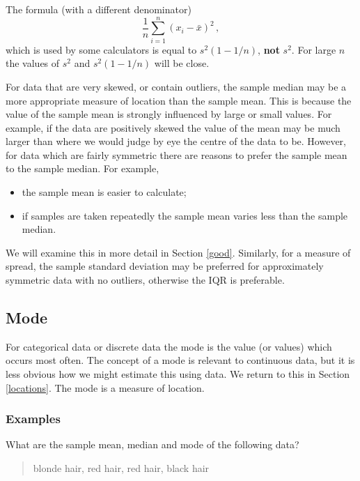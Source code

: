 \documentclass[
  british,
  11pt,
  openany, a4paper]{book}
\providecommand{\tightlist}{%
  \setlength{\itemsep}{0pt}\setlength{\parskip}{0pt}}
\begin{document}
The formula (with a different denominator)
\[ \frac{1}{n}\sum_{i=1}^n (x_i-\bar{x})^2 \,,\]
which is used by some calculators is equal to \(s^2 (1-1/n)\), \textbf{not} \(s^2\). For large \(n\) the values of \(s^2\) and \(s^2(1-1/n)\) will be close.

For data that are very skewed, or contain outliers, the sample median may be a more appropriate measure of location than the sample mean. This is because the value of the sample mean is strongly influenced by large or small values. For example, if the data are positively skewed the value of the mean may be much larger than where we would judge by eye the centre of the data to be. However, for data which are fairly symmetric there are reasons to prefer the sample mean to the sample median. For example,

\begin{itemize}
\tightlist
\item
  the sample mean is easier to calculate;
\item
  if samples are taken repeatedly the sample mean varies less than the sample median.
\end{itemize}

We will examine this in more detail in Section \ref{good}. Similarly, for a measure of spread, the sample standard deviation may be preferred for approximately symmetric data with no outliers, otherwise the IQR is preferable.

\subsection{Mode}\label{mode}

For categorical data or discrete data the mode is the value (or values) which occurs most often. The concept of a mode is relevant to continuous data, but it is less obvious how we might estimate this using data. We return to this in Section \ref{locations}. The mode is a measure of location.

\subsubsection*{Examples}\label{examples}

What are the sample mean, median and mode of the following data?

\begin{quote}
blonde hair, red hair, red hair, black hair
\end{quote}
\end{document}
